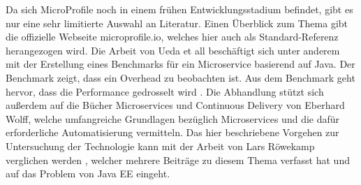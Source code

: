 Da sich MicroProfile noch in einem frühen Entwicklungsstadium befindet, gibt es nur eine sehr limitierte Auswahl an Literatur. Einen Überblick zum Thema gibt die offizielle Webseite microprofile.io, welches hier auch als Standard-Referenz herangezogen wird. Die Arbeit von Ueda et all beschäftigt sich unter anderem mit der Erstellung eines Benchmarks für ein Microservice basierend auf Java. Der Benchmark zeigt, dass ein Overhead zu beobachten ist. Aus dem Benchmark geht hervor, dass die Performance gedrosselt wird \cite{uht.2016}. Die Abhandlung stützt sich außerdem auf die Bücher Microservices \cite{EberhardWolff.2015} und Continuous Delivery \cite{EberhardWolff.2016} von Eberhard Wolff, welche umfangreiche Grundlagen bezüglich Microservices und die dafür erforderliche Automatisierung vermitteln. Das hier beschriebene Vorgehen zur Untersuchung der Technologie kann mit der Arbeit von Lars Röwekamp verglichen werden \cite{LarsRowekamp.2016}, welcher mehrere Beiträge zu diesem Thema verfasst hat und auf das Problem von Java EE eingeht. 





